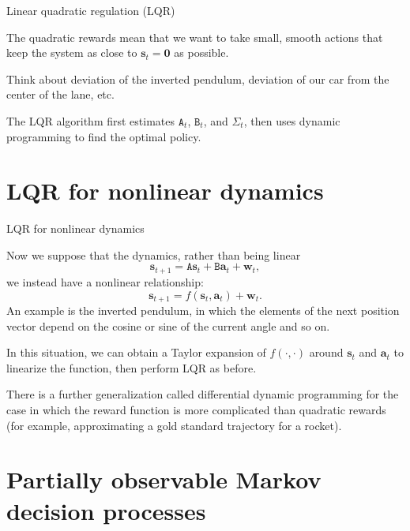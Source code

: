 \documentclass{beamer}
\renewcommand{\vec}[1]{\boldsymbol{#1}}
\newcommand{\mat}[1]{\mathtt{#1}}
\begin{document}
\begin{frame}{Linear quadratic regulation (LQR)}

  The quadratic rewards mean that we want to take \alert{small, smooth
  actions} that keep the system \alert{as close to $\vec{s}_t = \vec{0}$} as
  possible.

  \medskip

  Think about deviation of the inverted pendulum, deviation of our car
  from the center of the lane, etc.

  \medskip

  The \alert{LQR algorithm} first estimates $\mat{A}_t$, $\mat{B}_t$,
  and $\mat{\Sigma}_t$, then uses dynamic programming to find the
  optimal policy.
  
\end{frame}

\section{LQR for nonlinear dynamics}

\begin{frame}{LQR for nonlinear dynamics}

  Now we suppose that the dynamics, rather than being linear
  \[ \vec{s}_{t+1} = \mat{A}\vec{s}_{t} + \mat{B}\vec{a}_t + \vec{w}_t, \]
  we instead have a nonlinear relationship:
  \[ \vec{s}_{t+1} = f(\vec{s}_t,\vec{a}_t) + \vec{w}_t . \]
  An example is the inverted pendulum, in which the elements of the
  next position vector
  depend on the cosine or sine of the current angle and so on.

  \medskip

  In this situation, we can obtain a Taylor expansion of
  $f(\cdot,\cdot)$ around $\vec{s}_t$ and $\vec{a}_t$ to
  \alert{linearize} the function, then perform LQR as before.

  \medskip

  There is a further generalization called \alert{differential dynamic
    programming} for the case in which the reward function is more
  complicated than quadratic rewards (for example, approximating a
  gold standard trajectory for a rocket).

\end{frame}

\section{Partially observable Markov decision processes}
\end{document}
